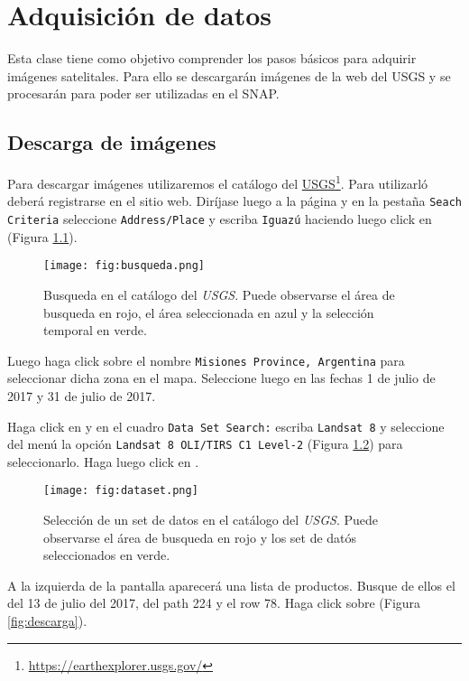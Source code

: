 \chapter{Adquisición de datos}

Esta clase tiene como objetivo comprender los pasos básicos para adquirir imágenes satelitales. Para ello se descargarán imágenes de la web del  USGS y se procesarán para poder ser utilizadas en el SNAP.

\section{Descarga de imágenes}

Para descargar imágenes utilizaremos el catálogo del \href{https://earthexplorer.usgs.gov/}{USGS}\footnote{\href{https://earthexplorer.usgs.gov/}{https://earthexplorer.usgs.gov/}}. Para utilizarló deberá registrarse en el sitio web. Diríjase luego a la página y en la pestaña \texttt{Seach Criteria} seleccione \texttt{Address/Place} y escriba \texttt{Iguazú} haciendo luego click en  (Figura \ref{fig:busqueda}).

\begin{figure}[h!]
    \centering
    \texttt{[image: fig:busqueda.png]}
    \caption{Busqueda en el catálogo del \emph{USGS}. Puede observarse el área de busqueda en rojo, el área seleccionada en azul y la selección temporal en verde.}
    \label{fig:busqueda}
\end{figure}

Luego haga click sobre el nombre \texttt{Misiones Province, Argentina} para seleccionar dicha zona en el mapa. Seleccione luego en  las fechas 1 de julio de 2017 y 31 de julio de 2017.

Haga click en  y en el cuadro \texttt{Data Set Search:} escriba \texttt{Landsat 8} y seleccione del menú la opción \texttt{Landsat 8 OLI/TIRS C1 Level-2} (Figura \ref{fig:dataset}) para seleccionarlo. Haga luego click en .

\begin{figure}[h!]
    \centering
    \texttt{[image: fig:dataset.png]}
    \caption{Selección de un set de datos en el catálogo del \emph{USGS}. Puede observarse el área de busqueda en rojo y los set de datós seleccionados en verde.}
    \label{fig:dataset}
\end{figure}

A la izquierda de la pantalla aparecerá una lista de productos. Busque de ellos el del 13 de julio del 2017, del path 224 y el row 78. Haga click sobre  (Figura \ref{fig:descarga}).

